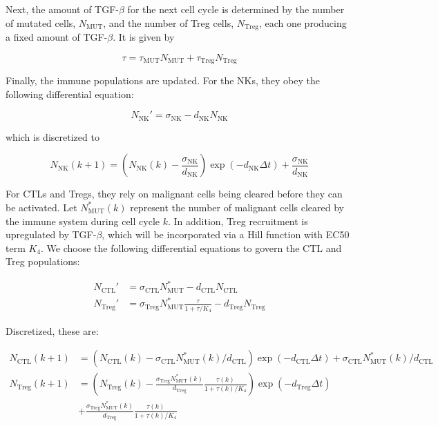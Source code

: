 \documentclass[11pt, a4paper, preprint]{article}
\begin{document}
Next, the amount of TGF-$\beta$ for the next cell cycle is determined by the number of mutated cells, $N_{\text{MUT}}$, and the number of Treg cells, $N_{\text{Treg}}$, each one producing a fixed amount of TGF-$\beta$. It is given by

\begin{equation}\tag{2.6}
\tau = \tau_{\text{MUT}}N_{\text{MUT}} + \tau_{\text{Treg}}N_{\text{Treg}}
\end{equation}


Finally, the immune populations are updated.
For the NKs, they obey the following differential equation:
 
\begin{equation}\tag{2.7}
N_{\text{NK}}' = \sigma_{\text{NK}} - d_{\text{NK}}N_{\text{NK}}
\end{equation}

which is discretized to
 
 \begin{equation}\tag{2.8}
N_{\text{NK}}(k+1) = \left (N_{\text{NK}}(k)-\frac{\sigma_{\text{NK}}}{d_{\text{NK}}} \right )\exp(-d_{\text{NK}}\Delta t)+\frac{\sigma_{\text{NK}}}{d_{\text{NK}}}
\end{equation}

For CTLs and Tregs, they rely on malignant cells being cleared before they can be activated.
Let $N_{\text{MUT}}^*(k)$ represent the number of malignant cells cleared by the immune system during cell cycle $k$.
In addition, Treg recruitment is upregulated by TGF-$\beta$, which will be incorporated via a Hill function with EC50 term $K_4$.
We choose the following differential equations to govern the CTL and Treg populations:

\begin{equation}\tag{2.9}
\begin{split}
N_\text{CTL}' & = \sigma_{\text{CTL}}N_{\text{MUT}}^* - d_{\text{CTL}}N_\text{CTL} \\
N_\text{Treg}' & = \sigma_{\text{Treg}}N_{\text{MUT}}^* \frac{\tau}{1+\tau/K_4}- d_{\text{Treg}}N_\text{Treg}
\end{split}
\end{equation}

Discretized, these are:

\begin{equation}\tag{2.10}
\begin{split}
N_\text{CTL}(k+1) & =  \left (N_\text{CTL}(k)-\sigma_{\text{CTL}}N_{\text{MUT}}^*(k)/d_{\text{CTL}}\right )\exp(- d_{\text{CTL}}\Delta t) + \sigma_{\text{CTL}}N_{\text{MUT}}^*(k)/d_{\text{CTL}}\\
N_\text{Treg}(k+1) & =  \left (N_\text{Treg}(k)-\frac{\sigma_{\text{Treg}}N_{\text{MUT}}^*(k)}{d_{\text{Treg}}} \frac{\tau(k)}{1+\tau(k)/K_4}\right )\exp(-d_{\text{Treg}}\Delta t)\\
&+ \frac{\sigma_{\text{Treg}}N_{\text{MUT}}^*(k)}{d_{\text{Treg}}} \frac{\tau(k)}{1+\tau(k)/K_4}
\end{split}
\end{equation}
\end{document}
